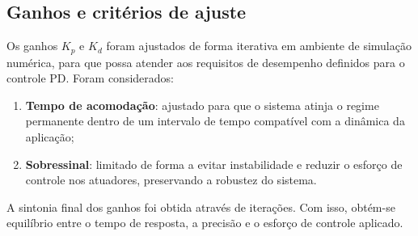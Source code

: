 \subsection{Ganhos e critérios de ajuste}
Os ganhos $K_p$ e $K_d$ foram ajustados de forma iterativa em ambiente de simulação numérica, para que possa atender aos requisitos de desempenho definidos para o controle PD.
Foram considerados:
\begin{enumerate}[label=\roman*.]
    \item \textbf{Tempo de acomodação}:
    ajustado para que o sistema atinja o regime permanente dentro de um intervalo de tempo compatível com a dinâmica da aplicação;
    \item \textbf{Sobressinal}:
    limitado de forma a evitar instabilidade e reduzir o esforço de controle nos atuadores, preservando a robustez do sistema.
\end{enumerate}

A sintonia final dos ganhos foi obtida através de iterações.
Com isso, obtém-se equilíbrio entre o tempo de resposta, a precisão e o esforço de controle aplicado.
